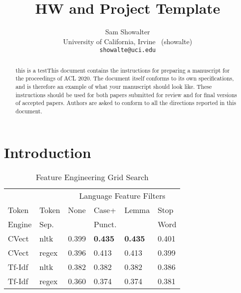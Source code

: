 \documentclass[11pt,a4paper]{article}
\title{HW and Project Template}
\author{Sam Showalter \\
  University of California, Irvine \ (showalte) \\  
\texttt{showalte@uci.edu}}
\date{}
\begin{document}
\maketitle
\begin{abstract}
this is a testThis document contains the instructions for preparing a manuscript for the proceedings of ACL 2020.
The document itself conforms to its own specifications, and is therefore an example of what your manuscript should look like.
These instructions should be used for both papers submitted for review and for final versions of accepted papers.
Authors are asked to conform to all the directions reported in this document.
\end{abstract}



\section{Introduction}




\begin{table}[h]
    \centering
    \caption{Feature Engineering Grid Search}
    \begin{tabular}{
    	l
        l
        l
        l
        l
        l
        }
        \toprule
        \multicolumn{2}{c}{} &
        \multicolumn{4}{c}{Language Feature Filters}\\
        \cmidrule(lr){3-6} 
        {Token}& {Token} &{None} &{Case+}&{Lemma}& {Stop}\\
        {Engine} & {Sep.} && {Punct.}&&{Word}\\
        \midrule
      CVect & nltk & 0.399& \textbf{0.435}& \textbf{0.435}& 0.401\\
        CVect & regex& 0.396& 0.413&0.413& 0.399\\
        Tf-Idf & nltk & 0.382&  0.382 &0.382 & 0.386\\
        Tf-Idf & regex & 0.360& 0.374 & 0.374& 0.381\\
        \bottomrule
    \end{tabular}
\end{table}


\end{document}
